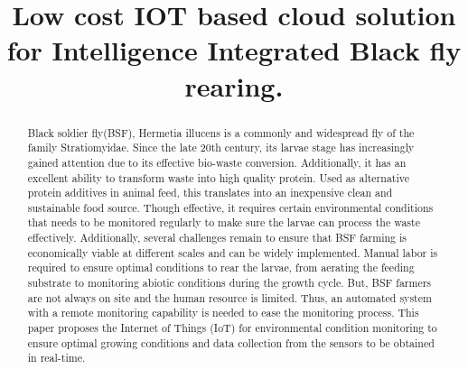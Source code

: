 \documentclass[conference]{IEEEtran}
\begin{document}
    \title{Low cost IOT based cloud solution for Intelligence Integrated Black fly rearing.}

    \author{




        \and


        \and
    }

    \maketitle

    \begin{abstract}
       Black soldier fly(BSF), Hermetia illucens is a commonly and widespread fly of the family Stratiomyidae. Since the late 20th century, its larvae stage has increasingly gained attention due to its effective bio-waste conversion. Additionally, it has an excellent ability to transform waste into high quality protein. Used as alternative protein additives in animal feed, this translates into an inexpensive clean and sustainable food source. Though effective, it requires certain environmental conditions that needs to be monitored regularly to make sure the larvae can process the waste effectively. Additionally, several challenges remain to ensure that BSF farming is economically viable at different scales and can be widely implemented. Manual labor is required to ensure optimal conditions to rear the larvae, from aerating the feeding substrate to monitoring abiotic conditions during the growth cycle. But, BSF farmers are not always on site and the human resource is limited. Thus, an automated system with a remote monitoring capability is needed to ease the monitoring process. This paper proposes the Internet of Things (IoT) for environmental condition monitoring to ensure optimal growing conditions and data collection from the sensors to be obtained in real-time.
    \end{abstract}
\end{document}
